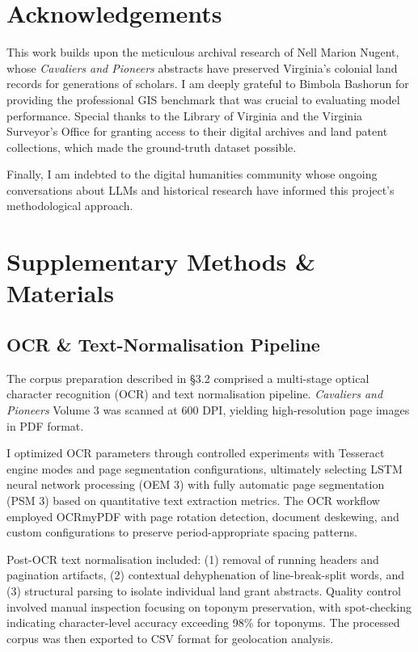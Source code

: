 \section{Acknowledgements}\label{acknowledgements}

This work builds upon the meticulous archival research of Nell Marion
Nugent, whose \emph{Cavaliers and Pioneers} abstracts have preserved
Virginia's colonial land records for generations of scholars. I am
deeply grateful to Bimbola Bashorun \citep{Bashorun2025_gis} for
providing the professional GIS benchmark that was crucial to evaluating
model performance. Special thanks to the Library of Virginia and the
Virginia Surveyor's Office for granting access to their digital archives
and land patent collections, which made the ground-truth dataset
possible.

Finally, I am indebted to the digital humanities community whose ongoing
conversations about LLMs and historical research have informed this
project's methodological approach.
\appendix

\section{Supplementary Methods \&
Materials}\label{appendix-a-supplementary-methods-materials}

\subsection{OCR \& Text-Normalisation
Pipeline}\label{a.1-ocr-text-normalisation-pipeline}

The corpus preparation described in §3.2 comprised a multi-stage optical
character recognition (OCR) and text normalisation pipeline.
\emph{Cavaliers and Pioneers} Volume 3 was scanned at 600 DPI, yielding
high-resolution page images in PDF format.

I optimized OCR parameters through controlled experiments with Tesseract
engine modes and page segmentation configurations, ultimately selecting
LSTM neural network processing (OEM 3) with fully automatic page
segmentation (PSM 3) based on quantitative text extraction metrics. The
OCR workflow employed OCRmyPDF with page rotation detection, document
deskewing, and custom configurations to preserve period-appropriate
spacing patterns.

Post-OCR text normalisation included: (1) removal of running headers and
pagination artifacts, (2) contextual dehyphenation of line-break-split
words, and (3) structural parsing to isolate individual land grant
abstracts. Quality control involved manual inspection focusing on
toponym preservation, with spot-checking indicating character-level
accuracy exceeding 98\% for toponyms. The processed corpus was then
exported to CSV format for geolocation analysis.

